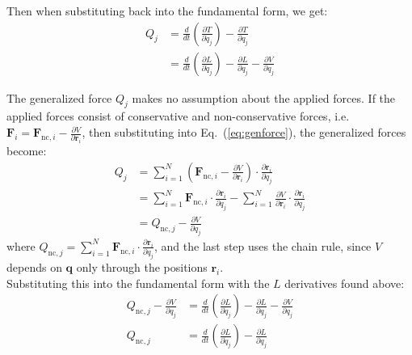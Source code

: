 \documentclass[titlepage]{article}
\begin{document}
Then when substituting back into the fundamental form, we get:
\begin{equation}
	\begin{split}
		Q_j&=\frac{d}{dt}\left(\frac{\partial T}{\partial\dot{q}_j}\right)-\frac{\partial T}{\partial q_j} \\
		&=\frac{d}{dt}\left(\frac{\partial L}{\partial\dot{q}_j}\right)-\frac{\partial L}{\partial q_j}-\frac{\partial V}{\partial q_j}
	\end{split}
\end{equation}

The generalized force $Q_j$ makes no assumption about the applied forces. If the applied forces consist of conservative and non-conservative forces, i.e. $\boldsymbol{F}_i=\boldsymbol{F}_{\text{nc},i}-\frac{\partial V}{\partial\boldsymbol{r}_i}$, then substituting into Eq.~(\ref{eq:genforce}), the generalized forces become:
\begin{equation}
	\begin{split}
		Q_j&=\sum_{i=1}^{N}\left(\boldsymbol{F}_{\text{nc},i}-\frac{\partial V}{\partial\boldsymbol{r}_i}\right)\cdot\frac{\partial\boldsymbol{r}_i}{\partial q_j} \\
		&=\sum_{i=1}^{N}\boldsymbol{F}_{\text{nc},i}\cdot\frac{\partial\boldsymbol{r}_i}{\partial q_j}-\sum_{i=1}^{N}\frac{\partial V}{\partial\boldsymbol{r}_i}\cdot\frac{\partial\boldsymbol{r}_i}{\partial q_j} \\
		&=Q_{\text{nc},j}-\frac{\partial V}{\partial q_j}
	\end{split}
\end{equation}
where $Q_{\text{nc},j}=\sum_{i=1}^{N}\boldsymbol{F}_{\text{nc},i}\cdot\frac{\partial\boldsymbol{r}_i}{\partial q_j}$, and the last step uses the chain rule, since $V$ depends on $\boldsymbol{q}$ only through the positions $\boldsymbol{r}_i$.\\

Substituting this into the fundamental form with the $L$ derivatives found above:
\begin{equation}
	\begin{split}
		Q_{\text{nc},j}-\frac{\partial V}{\partial q_j}&=\frac{d}{dt}\left(\frac{\partial L}{\partial\dot{q}_j}\right)-\frac{\partial L}{\partial q_j}-\frac{\partial V}{\partial q_j} \\
		Q_{\text{nc},j}&=\frac{d}{dt}\left(\frac{\partial L}{\partial\dot{q}_j}\right)-\frac{\partial L}{\partial q_j}
	\end{split}
\end{equation}
\end{document}
